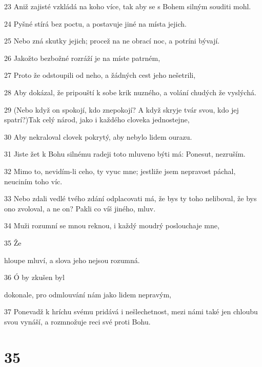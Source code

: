 \par 23 Aniž zajisté vzkládá na koho více, tak aby se s Bohem silným souditi mohl.
\par 24 Pyšné stírá bez poctu, a postavuje jiné na místa jejich.
\par 25 Nebo zná skutky jejich; procež na ne obrací noc, a potríni bývají.
\par 26 Jakožto bezbožné rozráží je na míste patrném,
\par 27 Proto že odstoupili od neho, a žádných cest jeho nešetrili,
\par 28 Aby dokázal, že pripouští k sobe krik nuzného, a volání chudých že vyslýchá.
\par 29 (Nebo když on spokojí, kdo znepokojí? A když skryje tvár svou, kdo jej spatrí?)Tak celý národ, jako i každého cloveka jednostejne,
\par 30 Aby nekraloval clovek pokrytý, aby nebylo lidem ourazu.
\par 31 Jiste žet k Bohu silnému radeji toto mluveno býti má: Ponesut, nezruším.
\par 32 Mimo to, nevidím-li ceho, ty vyuc mne; jestliže jsem nepravost páchal, neuciním toho víc.
\par 33 Nebo zdali vedlé tvého zdání odplacovati má, že bys ty toho neliboval, že bys ono zvoloval, a ne on? Pakli co víš jiného, mluv.
\par 34 Muži rozumní se mnou reknou, i každý moudrý poslouchaje mne,
\par 35 Že \par hloupe mluví, a slova jeho nejsou rozumná.
\par 36 Ó by zkušen byl \par dokonale, pro odmlouvání nám jako lidem nepravým,
\par 37 Ponevadž k hríchu svému pridává i nešlechetnost, mezi námi také jen chloubu svou vynáší, a rozmnožuje reci své proti Bohu.

\chapter{35}

